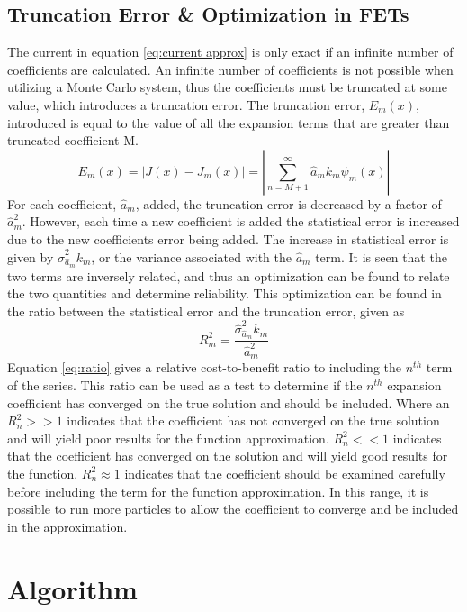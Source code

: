 \documentclass[10tma4paper]{article}
\begin{document}
\subsection{Truncation Error \& Optimization in FETs}\label{TEO}

The current in equation \eqref{eq:current approx} is only exact if an infinite number of coefficients are calculated. An infinite number of coefficients is not possible when utilizing a Monte Carlo system, thus the coefficients must be truncated at some value, which introduces a truncation error. The truncation error, $E_{m}(x)$, introduced is equal to the value of all the expansion terms that are greater than truncated coefficient M.
\begin{equation}\label{eq:trunc unc}
E_{m}(x) = |J(x)-J_{m}(x)|=|\sum_{n=M+1}^{\infty}\hat{a}_{m}k_{m}\psi_{m}(x)|
\end{equation}
For each coefficient, $\hat{a}_{m}$, added, the truncation error is decreased by a factor of $\hat{a}_{m}^2$. However, each time a new coefficient is added the statistical error is increased due to the new coefficients error being added. The increase in statistical error is given by $\hat{\sigma}_{\hat{a}_{m}}^2k_{m}$, or the variance associated with the $\hat{a}_{m}$ term. It is seen that the two terms are inversely related, and thus an optimization can be found to relate the two quantities and determine reliability. This optimization can be found in the ratio between the statistical error and the truncation error, given as
\begin{equation}\label{eq:ratio}
R_{m}^2=\frac{\hat{\sigma}_{\hat{a}_{m}}^2k_{m}}{\hat{a}_{m}^2}
\end{equation}
Equation \eqref{eq:ratio} gives a relative cost-to-benefit ratio to including the $n^{th}$ term of the series. This ratio can be used as a test to determine if the $n^{th}$ expansion coefficient has converged on the true solution and should be included. Where an $R_{n}^2>>1$ indicates that the coefficient has not converged on the true solution and will yield poor results for the function approximation. $R_{n}^2<<1$ indicates that the coefficient has converged on the solution and will yield good results for the function. $R_{n}^2\approx1$ indicates that the coefficient should be examined carefully before including the term for the function approximation. In this range, it is possible to run more particles to allow the coefficient to converge and be included in the approximation.

\section{Algorithm}\label{algorith}
\end{document}
